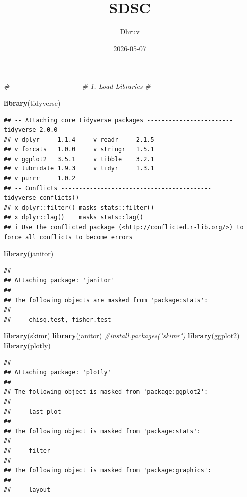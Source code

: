 \documentclass[
]{article}
\title{SDSC}
\author{Dhruv}
\date{2026-05-07}
\newenvironment{Shaded}{\begin{snugshade}}{\end{snugshade}}
\newcommand{\CommentTok}[1]{\textcolor[rgb]{0.56,0.35,0.01}{\textit{#1}}}
\newcommand{\FunctionTok}[1]{\textcolor[rgb]{0.13,0.29,0.53}{\textbf{#1}}}
\newcommand{\NormalTok}[1]{#1}
\begin{document}
\maketitle

\begin{Shaded}
\begin{Highlighting}[]
\CommentTok{\# {-}{-}{-}{-}{-}{-}{-}{-}{-}{-}{-}{-}{-}{-}{-}{-}{-}{-}{-}{-}{-}{-}{-}{-}{-}{-}{-}}
\CommentTok{\# 1. Load Libraries}
\CommentTok{\# {-}{-}{-}{-}{-}{-}{-}{-}{-}{-}{-}{-}{-}{-}{-}{-}{-}{-}{-}{-}{-}{-}{-}{-}{-}{-}{-}}

\FunctionTok{library}\NormalTok{(tidyverse)}
\end{Highlighting}
\end{Shaded}

\begin{verbatim}
## -- Attaching core tidyverse packages ------------------------ tidyverse 2.0.0 --
## v dplyr     1.1.4     v readr     2.1.5
## v forcats   1.0.0     v stringr   1.5.1
## v ggplot2   3.5.1     v tibble    3.2.1
## v lubridate 1.9.3     v tidyr     1.3.1
## v purrr     1.0.2     
## -- Conflicts ------------------------------------------ tidyverse_conflicts() --
## x dplyr::filter() masks stats::filter()
## x dplyr::lag()    masks stats::lag()
## i Use the conflicted package (<http://conflicted.r-lib.org/>) to force all conflicts to become errors
\end{verbatim}

\begin{Shaded}
\begin{Highlighting}[]
\FunctionTok{library}\NormalTok{(janitor)}
\end{Highlighting}
\end{Shaded}

\begin{verbatim}
## 
## Attaching package: 'janitor'
## 
## The following objects are masked from 'package:stats':
## 
##     chisq.test, fisher.test
\end{verbatim}

\begin{Shaded}
\begin{Highlighting}[]
\FunctionTok{library}\NormalTok{(skimr)}
\FunctionTok{library}\NormalTok{(janitor)}
\CommentTok{\#install.packages("skimr")}
\FunctionTok{library}\NormalTok{(ggplot2)}
\FunctionTok{library}\NormalTok{(plotly)}
\end{Highlighting}
\end{Shaded}

\begin{verbatim}
## 
## Attaching package: 'plotly'
## 
## The following object is masked from 'package:ggplot2':
## 
##     last_plot
## 
## The following object is masked from 'package:stats':
## 
##     filter
## 
## The following object is masked from 'package:graphics':
## 
##     layout
\end{verbatim}
\end{document}
